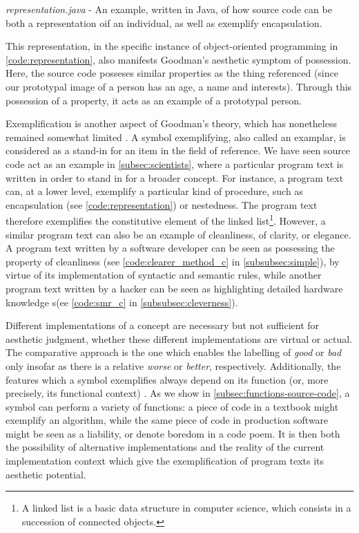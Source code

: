 \begin{listing}
    \inputminted{java}{./corpus/representation.java}
    \caption{\emph{representation.java} - An example, written in Java, of how source code can be both a representation oif an individual, as well as exemplify encapsulation.}
    \label{code:representation}
\end{listing}

This representation, in the specific instance of object-oriented programming in \autoref{code:representation}, also manifests Goodman's aesthetic symptom of possession. Here, the source code posseses similar properties as the thing referenced (since our prototypal image of a person has an age, a name and interests). Through this possession of a property, it acts as an example of a prototypal person.

Exemplification is another aspect of Goodman's theory, which has nonetheless remained somewhat limited \citep{elgin_making_2011}. A symbol exemplifying, also called an examplar, is considered as a stand-in for an item in the field of reference. We have seen source code act as an example in \autoref{subsec:scientists}, where a particular program text is written in order to stand in for a broader concept. For instance, a program text can, at a lower level, exemplify a particular kind of procedure, such as encapsulation (see \autoref{code:representation}) or nestedness. The program text therefore exemplifies the constitutive element of the linked list\footnote{A linked list is a basic data structure in computer science, which consists in a succession of connected objects.}. However, a similar program text can also be an example of cleanliness, of clarity, or elegance. A program text written by a software developer can be seen as possessing the property of cleanliness (see \autoref{code:clearer_method_c} in \autoref{subsubsec:simple}), by virtue of its implementation of syntactic and semantic rules, while another program text written by a hacker can be seen as highlighting detailed hardware knowledge s(ee \autoref{code:smr_c} in \autoref{subsubsec:cleverness}).

Different implementations of a concept are necessary but not sufficient for aesthetic judgment, whether these different implementations are virtual or actual. The comparative approach is the one which enables the labelling of \emph{good} or \emph{bad} only insofar as there is a relative \emph{worse} or \emph{better}, respectively. Additionally, the features which a symbol exemplifies always depend on its function (or, more precisely, its functional context) \citep{elgin_understanding_1993}. As we show in \autoref{subsec:functions-source-code}, a symbol can perform a variety of functions: a piece of code in a textbook might exemplify an algorithm, while the same piece of code in production software might be seen as a liability, or denote boredom in a code poem. It is then both the possibility of alternative implementations and the reality of the current implementation context which give the exemplification of program texts its aesthetic potential.

